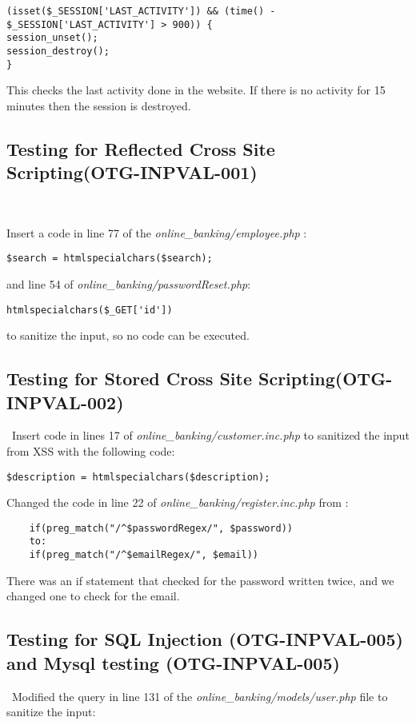 \documentclass[headsepline,footsepline,footinclude=false,oneside,fontsize=11pt,paper=a4,listof=totoc,bibliography=totoc]{scrbook} %
\begin{document}
\begin{lstlisting}
(isset($_SESSION['LAST_ACTIVITY']) && (time() - $_SESSION['LAST_ACTIVITY'] > 900)) { 
session_unset();    
session_destroy();   
}
\end{lstlisting} 


This checks the last activity done in the website. If there is no activity for 15 minutes then the session is destroyed.\\



\subsection{Testing for Reflected Cross Site Scripting(OTG-INPVAL-001)} \

Insert a code in line 77 of the\textit{ online\_banking/employee.php} : 
\begin{lstlisting}
$search = htmlspecialchars($search);  

\end{lstlisting}
and line 54 of \textit{online\_banking/passwordReset.php}:  
\begin{lstlisting} 
htmlspecialchars($_GET['id']) 
\end{lstlisting}
to sanitize the input, so no code can be executed.
\pagebreak
\subsection{Testing for Stored Cross Site Scripting(OTG-INPVAL-002)}\
Insert code in lines 17 of \textit{online\_banking/customer.inc.php} to sanitized the input from XSS with the following code:   

\begin{lstlisting} 
$description = htmlspecialchars($description);
\end{lstlisting}

Changed the code in line 22 of \textit{online\_banking/register.inc.php} from :

\begin{lstlisting} 
    if(preg_match("/^$passwordRegex/", $password))
    to:
    if(preg_match("/^$emailRegex/", $email))
\end{lstlisting}
There was an if statement that checked for the password written twice, and we changed one to check for the email.\\



\subsection{Testing for SQL Injection (OTG-INPVAL-005) and Mysql testing (OTG-INPVAL-005)}\
Modified the query in line 131 of the \textit{online\_banking/models/user.php} file to sanitize the input: 
  
\end{document}
